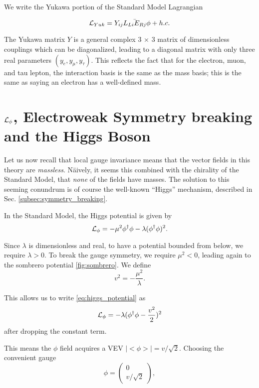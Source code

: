 We write the Yukawa portion of the Standard Model Lagrangian

\begin{equation}
\mathcal{L}_{Yuk} = Y_{ij}\bar{L_{Li} E_{Rj}} \phi + h.c.
\end{equation}

The Yukawa matrix $Y$ is a general complex 3 $\times$ 3 matrix of dimensionless couplings which can be diagonalized, leading to a diagonal matrix with only three real parameters $(y_e , y_\mu , y_\tau)$.
This reflects the fact that for the electron, muon, and tau lepton, the interaction basis is the same as the mass basis; this is the same as saying an electron has a well-defined mass.

\section{$\mathcal{L}_\phi$, Electroweak Symmetry breaking and the Higgs Boson}

Let us now recall that local gauge invariance means that the vector fields in this theory are \textit{massless}.
N\"aively, it seems this combined with the chirality of the Standard Model, that \textit{none} of the fields have masses.
The solution to this seeming conundrum is of course the well-known ``Higgs'' mechanism, described in Sec. \ref{subsec:symmetry_breaking}.

In the Standard Model, the Higgs potential is given by
\begin{equation} \label{eq:higgs_potential}
\mathcal{L}_\phi = -\mu^2 \phi^\dagger \phi - \lambda (\phi^\dagger \phi)^2.
\end{equation}

Since $\lambda$ is dimensionless and real, to have a potential bounded from below, we require $\lambda > 0$.
To break the gauge symmetry, we require $\mu^2 < 0$, leading again to the sombrero potential \ref{fig:sombrero}.
We define
\begin{equation}
v^2 = - \frac{\mu^2}{\lambda}.
\end{equation}

This allows us to write \ref{eq:higgs_potential} as
\begin{equation} \label{eq:higgs_potential_rewritten}
\mathcal{L}_\phi = - \lambda (\phi^\dagger \phi - \frac{v^2}{2})^2
\end{equation}
after dropping the constant term.

This means the $\phi$ field acquires a VEV $|<\phi>| = v/\sqrt{2}$.
Choosing the convenient gauge
\begin{equation}
\phi = \begin{pmatrix} 0 \\ v/\sqrt{2} \end{pmatrix},
\end{equation}

